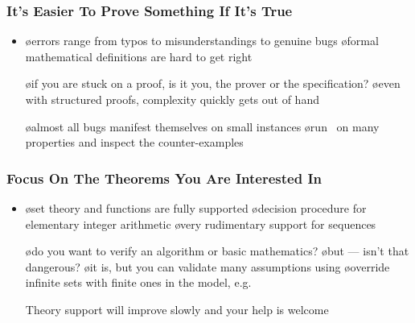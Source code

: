 \begin{frame}
  \frametitle{It's Easier To Prove Something If It's True}

  \begin{itemize}
  \item {}

    \begin{itemize}
    \o errors range from typos to misunderstandings to genuine bugs
    \o formal mathematical definitions are hard to get right
    \end{itemize}

  \oo {}

    \begin{itemize}
    \o if you are stuck on a proof, is it you, the prover or the specification?
    \o even with structured proofs, complexity quickly gets out of hand
    \end{itemize}

  \oo {}

    \begin{itemize}
    \o almost all bugs manifest themselves on small instances
    \o run \tlc\ on many properties and inspect the counter-examples
    \end{itemize}
  \end{itemize}
\end{frame}

\begin{frame}
  \frametitle{Focus On The Theorems You Are Interested In}

  \begin{itemize}
  \item {}

    \begin{itemize}
    \o set theory and functions are fully supported
    \o decision procedure for elementary integer arithmetic
    \o very rudimentary support for sequences
    \end{itemize}

\pause

  \oo {}

    \begin{itemize}
    \o do you want to verify an algorithm or basic mathematics?
    \o but --- isn't that dangerous?
    \o it is, but you can validate many assumptions using \tlc
    \o override infinite sets with finite ones in the model, e.g.\ \ 
    \end{itemize}

\pause

  \oo \alert{Theory support will improve slowly and your help is welcome}
  \end{itemize}
\end{frame}

